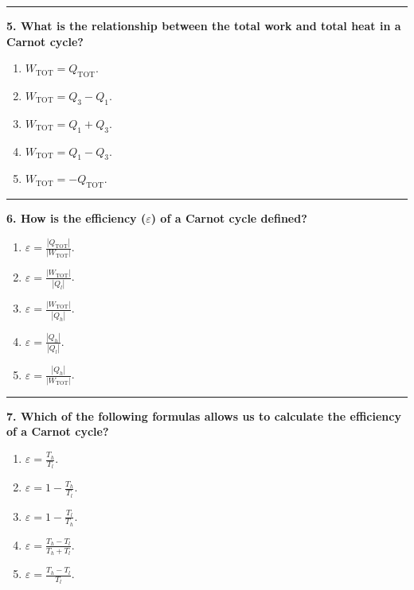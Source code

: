 \documentclass[
  9pt,
]{extbook}
\providecommand{\tightlist}{%
  \setlength{\itemsep}{0pt}\setlength{\parskip}{0pt}}
\theoremstyle{definition}
\theoremstyle{definition}
\theoremstyle{definition}
\theoremstyle{definition}
\theoremstyle{remark}
\begin{document}
\begin{center}\rule{0.5\linewidth}{0.5pt}\end{center}

\textbf{5. What is the relationship between the total work and total heat in a Carnot cycle?}

\begin{enumerate}
\def\labelenumi{\alph{enumi}.}
\tightlist
\item
  \(W_{\text{TOT}} = Q_{\text{TOT}}\).
\item
  \(W_{\text{TOT}} = Q_3 - Q_1\).
\item
  \(W_{\text{TOT}} = Q_1 + Q_3\).
\item
  \(W_{\text{TOT}} = Q_1 - Q_3\).
\item
  \(W_{\text{TOT}} = -Q_{\text{TOT}}\).
\end{enumerate}

\begin{center}\rule{0.5\linewidth}{0.5pt}\end{center}

\textbf{6. How is the efficiency (\(\varepsilon\)) of a Carnot cycle defined?}

\begin{enumerate}
\def\labelenumi{\alph{enumi}.}
\tightlist
\item
  \(\varepsilon = \frac{|Q_{\text{TOT}}|}{|W_{\text{TOT}}|}\).
\item
  \(\varepsilon = \frac{|W_{\text{TOT}}|}{|Q_l|}\).
\item
  \(\varepsilon = \frac{|W_{\text{TOT}}|}{|Q_h|}\).
\item
  \(\varepsilon = \frac{|Q_h|}{|Q_l|}\).
\item
  \(\varepsilon = \frac{|Q_h|}{|W_{\text{TOT}}|}\).
\end{enumerate}

\begin{center}\rule{0.5\linewidth}{0.5pt}\end{center}

\textbf{7. Which of the following formulas allows us to calculate the efficiency of a Carnot cycle?}

\begin{enumerate}
\def\labelenumi{\alph{enumi}.}
\tightlist
\item
  \(\varepsilon = \frac{T_h}{T_l}\).
\item
  \(\varepsilon = 1 - \frac{T_h}{T_l}\).
\item
  \(\varepsilon = 1 - \frac{T_l}{T_h}\).
\item
  \(\varepsilon = \frac{T_h - T_l}{T_h + T_l}\).
\item
  \(\varepsilon = \frac{T_h - T_l}{T_l}\).
\end{enumerate}
\end{document}
